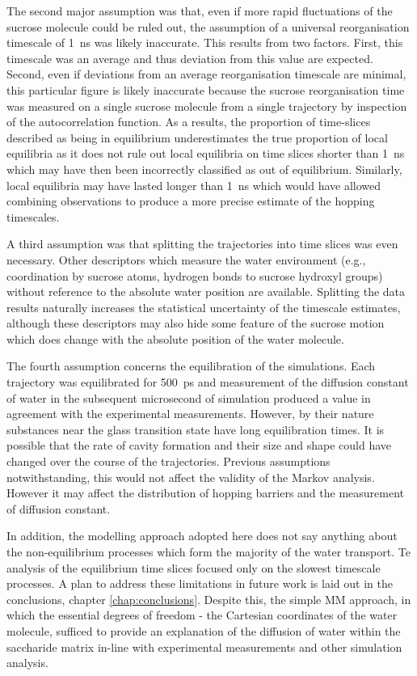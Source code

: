 The second major assumption was that, even if more rapid fluctuations of the sucrose molecule could be ruled out, the assumption of a universal reorganisation timescale of \SI{1}{\nano\second} was likely inaccurate. This results from two factors. First, this timescale was an average and thus deviation from this value are expected.  Second, even if deviations from an average reorganisation timescale are minimal, this particular figure is likely inaccurate because the sucrose reorganisation time was measured on a single sucrose molecule from a single trajectory by inspection of the autocorrelation function.  As a results, the proportion of time-slices described as being in equilibrium underestimates the true proportion of local equilibria as it does not rule out local equilibria on time slices shorter than \SI{1}{\nano\second} which may have then been incorrectly classified as out of equilibrium. Similarly, local equilibria may have lasted longer than \SI{1}{\nano\second} which would have allowed combining observations to produce a more precise estimate of the hopping timescales. 

A third assumption was that splitting the trajectories into time slices was even necessary. Other descriptors which measure the water environment (e.g., coordination by sucrose atoms, hydrogen bonds to sucrose hydroxyl groups) without reference to the absolute water position are available.  Splitting the data results naturally increases the statistical uncertainty of the timescale estimates, although these descriptors may also hide some feature of the sucrose motion which does change with the absolute position of the water molecule.  

The fourth assumption concerns the equilibration of the simulations. Each trajectory was equilibrated for \SI{500}{\pico\second} and measurement of the diffusion constant of water in the subsequent microsecond of simulation produced a value in agreement with the experimental measurements.  However, by their nature substances near the glass transition state have long equilibration times. It is possible that the rate of cavity formation and their size and shape could have changed over the course of the trajectories. Previous assumptions notwithstanding, this would not affect the validity of the Markov analysis. However it may affect the distribution of hopping barriers and the measurement of diffusion constant.  

In addition, the modelling approach adopted here does not say anything about the non-equilibrium processes which form the majority of the water transport. Te analysis of the equilibrium time slices focused only on the slowest timescale processes. A plan to address these limitations in future work is laid out in the conclusions, chapter \ref{chap:conclusions}. Despite this, the simple MM approach, in which the essential degrees of freedom - the Cartesian coordinates of the water molecule, sufficed to provide an explanation of the diffusion of water within the saccharide matrix in-line with experimental measurements and other simulation analysis. 



